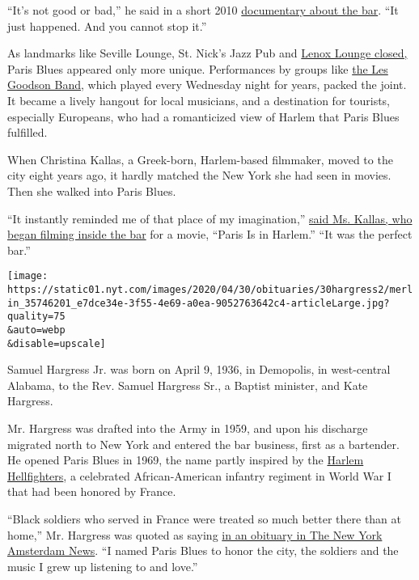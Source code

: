 ``It's not good or bad,'' he said in a short 2010
\href{https://viewing.nyc/mr-blues-a-profile-of-harlems-paris-blues-bar-and-owner-samuel-hargress-jr/}{documentary
about the bar}. ``It just happened. And you cannot stop it.''

As landmarks like Seville Lounge, St. Nick's Jazz Pub and
\href{https://www.nytimes.com/2012/12/08/nyregion/harlem-to-say-goodbye-to-the-lenox-lounge.html}{Lenox
Lounge closed,} Paris Blues appeared only more unique. Performances by
groups like \href{https://www.youtube.com/watch?v=oqxQsgDyj1g}{the Les
Goodson Band}, which played every Wednesday night for years, packed the
joint. It became a lively hangout for local musicians, and a destination
for tourists, especially Europeans, who had a romanticized view of
Harlem that Paris Blues fulfilled.

When Christina Kallas, a Greek-born, Harlem-based filmmaker, moved to
the city eight years ago, it hardly matched the New York she had seen in
movies. Then she walked into Paris Blues.

``It instantly reminded me of that place of my imagination,''
\href{http://www.talkhouse.com/harlem-blues-remembering-sam-hargress-jr/}{said
Ms. Kallas, who began filming inside the bar} for a movie, ``Paris Is in
Harlem.'' ``It was the perfect bar.''

\texttt{[image: https://static01.nyt.com/images/2020/04/30/obituaries/30hargress2/merlin\_35746201\_e7dce34e-3f55-4e69-a0ea-9052763642c4-articleLarge.jpg?quality=75\\\&auto=webp\\\&disable=upscale]}

Samuel Hargress Jr. was born on April 9, 1936, in Demopolis, in
west-central Alabama, to the Rev. Samuel Hargress Sr., a Baptist
minister, and Kate Hargress.

Mr. Hargress was drafted into the Army in 1959, and upon his discharge
migrated north to New York and entered the bar business, first as a
bartender. He opened Paris Blues in 1969, the name partly inspired by
the
\href{https://www.smithsonianmag.com/history/one-hundred-years-ago-harlem-hellfighters-bravely-led-us-wwi-180968977/}{Harlem
Hellfighters}, a celebrated African-American infantry regiment in World
War I that had been honored by France.

``Black soldiers who served in France were treated so much better there
than at home,'' Mr. Hargress was quoted as saying
\href{http://amsterdamnews.com/news/2020/apr/23/paris-blues-owner-dies/}{in
an obituary in The New York Amsterdam News}. ``I named Paris Blues to
honor the city, the soldiers and the music I grew up listening to and
love.''

